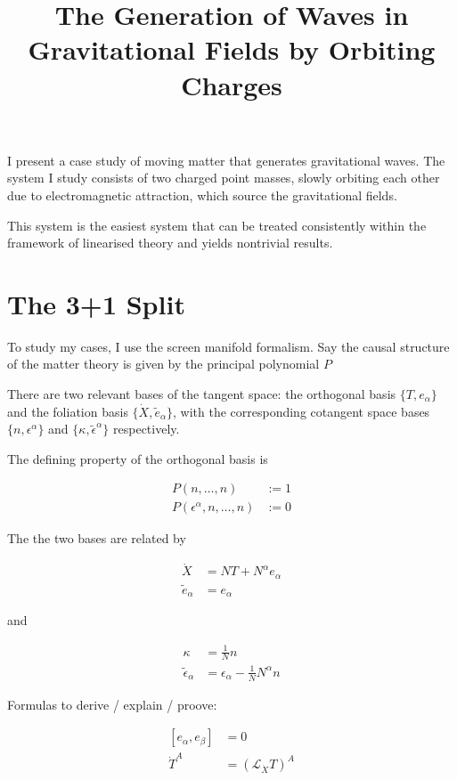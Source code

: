 \documentclass[11pt]{article}
\begin{document}
\title{The Generation of Waves in Gravitational Fields by Orbiting Charges}

I present a case study of moving matter that generates gravitational  waves. The system I study consists of two charged point masses, slowly orbiting each other due to electromagnetic attraction, which source the gravitational fields.

This system is the easiest system that can be treated consistently within the framework of linearised theory and yields nontrivial results.

\section{The 3+1 Split}

To study my cases, I use the screen manifold formalism. Say the causal structure of the matter theory is given by the principal polynomial $P$

There are two relevant bases of the tangent space: the orthogonal basis $\{T, e_\alpha\}$ and the foliation basis $\{\dot{X} , \tilde{e}_\alpha\}$, with the corresponding cotangent space bases $\{ n, \epsilon^\alpha\}$ and $\{\kappa, \tilde{\epsilon}^\alpha \}$ respectively. 

The defining property of the orthogonal basis is

\begin{align}
	P \left( n , \dots, n \right) &:= 1 \label{frame_cond_1}\\ 
	P \left( \epsilon^\alpha , n,  \dots, n \right) &:= 0 \label{frame_cond_2}
\end{align}


The the two bases are related by

\begin{align}	
	\dot{X} &= N T + N^\alpha e_\alpha\\
	\tilde{e}_\alpha &= e_\alpha
\end{align}

and

\begin{align}	
	\kappa &= \frac{1}{N} n \\
	\tilde{\epsilon}_\alpha &= \epsilon_\alpha - \frac{1}{N} N^\alpha n
\end{align}

Formulas to derive / explain / proove:

\begin{align}
	\left[ e_{\alpha}, e_{\beta}\right] &= 0 \\
	\dot{T}^{A} &= \left( \mathcal{L}_{\dot{X}} T \right)^A
\end{align}
\end{document}
